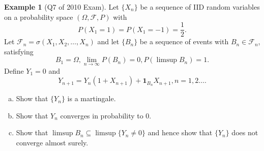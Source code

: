\documentclass[10pt, oneside, reqno]{amsart}
\theoremstyle{plain}%
\theoremstyle{definition}
\newtheorem{exmp}[thm]{Example}
\theoremstyle{remark}
\newcommand{\sigf}{\mathcal{F}}
\begin{document}
\begin{exmp}[Q7 of 2010 Exam]
	Let $\{ X_n \}$ be a sequence of IID random variables on a probability space $(\Omega, \sigf, P)$ with \[
		P(X_1 = 1) = P(X_1 = -1) = \frac{1}{2}.
	\]  Let $\sigf_n = \sigma(X_1, X_2, \dots, X_n)$ and let $\{B_n\}$ be a sequence of events with $B_n \in \sigf_n$, satisfying \[
		B_1 = \Omega, \lim_{n \rightarrow \infty} P(B_n) = 0, P(\limsup B_n) = 1.
	\]  Define $Y_1 = 0$ and \[
		Y_{n+1} = Y_n(1 + X_{n+1}) + \mathbf{1}_{B_n} X_{n+1}, n = 1, 2 \dots.
	\]
	\begin{enumerate}[(a)]
		\item Show that $\{ Y_n \}$ is a martingale.
		\item Show that $Y_n$ converges in probability to 0.
		\item Show that $\limsup B_n \subseteq \limsup \{ Y_n \neq 0 \}$ and hence show that $\{ Y_n \}$ does not converge almost surely.
	\end{enumerate}
\end{exmp} 
\end{document}
